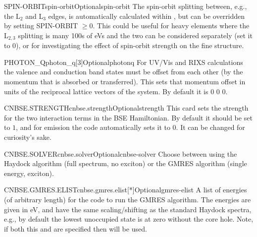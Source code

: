\documentclass[11pt]{report}
\begin{document}

\begin{Card}{SPIN-ORBIT}{spin-orbit}{Optional}{spin-orbit}
The spin-orbit splitting between, e.g., the L$_2$ and L$_3$ edges, is automatically calculated within , but can be overridden by setting SPIN-ORBIT $ \ge 0$. 
This could be useful for heavy elements where the L$_{2,3}$ splitting is many 100s of eVs and the two can be considered separately (set it to 0), or for investigating the effect of spin-orbit strength on the fine structure.
\end{Card}

\begin{Card}{PHOTON\_Q}{photon\_q[3]}{Optional}{photonq}
For UV/Vis and RIXS calculations the valence and conduction band states must be offset from each other (by the momentum that is absorbed or transferred). 
This sets that momentum offset in units of the reciprocal lattice vectors of the system.
By default it is 0 0 0.
\end{Card}

\begin{Card}{CNBSE.STRENGTH}{cnbse.strength}{Optional}{strength}
This card sets the strength for the two interaction terms in the BSE Hamiltonian. By default it should be set to $1$, and for emission the code automatically sets it to $0$. 
It can be changed for curiosity's sake.
\end{Card}

\begin{Card}{CNBSE.SOLVER}{cnbse.solver}{Optional}{cnbse-solver}
Choose between using the Haydock algorithm (full spectrum, no exciton) or the GMRES algorithm (single energy, exciton).
\end{Card}

\begin{Card}{CNBSE.GMRES.ELIST}{cnbse.gmres.elist[*]}{Optional}{gmres-elist}
A list of energies (of arbitrary length) for the code to run the GMRES algorithm. 
The energies are given in eV, and have the same scaling/shifting as the standard Haydock spectra, e.g., by default the lowest unoccupied state is at zero without the core hole.
Note, if both this and  are specified then  will be used.
\end{Card}
\end{document}

